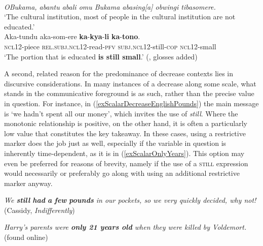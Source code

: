 \begin{exe}
	\ex {}\label{exScalarRuuliPortion}\\
	\textit{OBukama, abantu abali omu Bukama abasing\textup{[}a\textup{]} obwingi tibasomere.}\\
	\lq{}The cultural institution, most of people in the cultural institution are not educated.\rq{}\\
	\gll Aka-tundu aka-som-ere \textbf{ka}-\textbf{kya}-\textbf{li} \textbf{ka}-\textbf{tono}.\\
	\textsc{ncl}12-piece \textsc{rel}.\textsc{subj}.\textsc{ncl}12-read-\textsc{pfv} \textsc{subj}.\textsc{ncl}12-still-\textsc{cop} \textsc{ncl}12-small\\
	\glt \lq The portion that is educated \textbf{is still small}.\rq{ }(\cite{RuuliCorpus}, glosses added)
\end{exe}

A second, related reason for the predominance of decrease contexts lies in discursive considerations. In many instances of a decrease along some scale, what stands in the communicative foreground is  as such, rather than the precise value in question. For instance, in (\ref{exScalarDecreaseEnglishPounds}) the main message is \lq we hadn't spent all our money\rq{}, which invites the use of \textit{still}. Where the monotonic relationship is positive, on the other hand, it is often a particularly low value that constitutes the key takeaway. In these cases, using a restrictive marker does the job just as well, especially if the variable in question is inherently time-dependent, as it is in (\ref{exScalarOnlyYears}). This option may even be preferred for reasons of brevity, namely if the use of a \textsc{still} expression would necessarily or preferably go along with using an additional restrictive marker anyway.

\begin{exe}
	\ex 
	\begin{xlist}	
	\exi{}
	\ex 
	\textit{We \textbf{still} \textbf{had} \textbf{a} \textbf{few} \textbf{pounds} in our pockets, so we very quickly decided, why not!} (Cassidy, \textit{Indifferently}) 	\label{exScalarDecreaseEnglishPounds}
	
	\ex{}
	\textit{Harry's parents were \textbf{only 21 years old} when they were killed by Voldemort.} (found online)\label{exScalarOnlyYears}%
	\end{xlist}
\end{exe}

